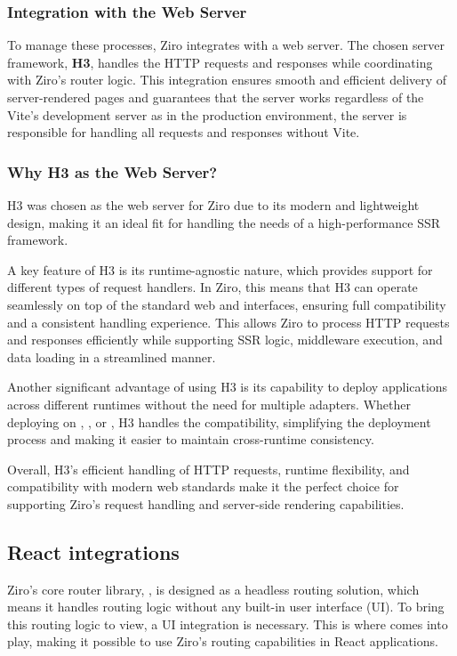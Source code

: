 \subsubsection{Integration with the Web Server}
To manage these processes, Ziro integrates with a web server. The chosen server framework, \textbf{H3}, handles the HTTP requests and responses while coordinating with Ziro’s router logic. This integration ensures smooth and efficient delivery of server-rendered pages and guarantees that the server works regardless of the Vite's development server as in the production environment, the server is responsible for handling all requests and responses without Vite.

\subsubsection{Why H3 as the Web Server?}

H3 was chosen as the web server for Ziro due to its modern and lightweight design, making it an ideal fit for handling the needs of a high-performance SSR framework.

A key feature of H3 is its runtime-agnostic nature, which provides support for different types of request handlers. In Ziro, this means that H3 can operate seamlessly on top of the standard web  and  interfaces, ensuring full compatibility and a consistent handling experience. This allows Ziro to process HTTP requests and responses efficiently while supporting SSR logic, middleware execution, and data loading in a streamlined manner.

Another significant advantage of using H3 is its capability to deploy applications across different runtimes without the need for multiple adapters. Whether deploying on , , or , H3 handles the compatibility, simplifying the deployment process and making it easier to maintain cross-runtime consistency.

Overall, H3's efficient handling of HTTP requests, runtime flexibility, and compatibility with modern web standards make it the perfect choice for supporting Ziro’s request handling and server-side rendering capabilities.

\subsection{React integrations}

Ziro’s core router library, , is designed as a headless routing solution, which means it handles routing logic without any built-in user interface (UI). To bring this routing logic to view, a UI integration is necessary. This is where  comes into play, making it possible to use Ziro’s routing capabilities in React applications.

